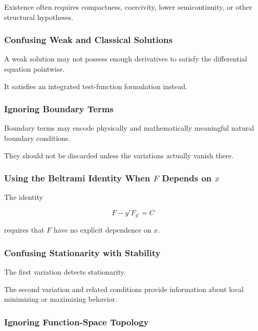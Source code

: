 Existence often requires compactness, coercivity, lower semicontinuity,
or other structural hypotheses.

\subsubsection{Confusing Weak and Classical Solutions}

A weak solution may not possess enough derivatives to satisfy the
differential equation pointwise.

It satisfies an integrated test-function formulation instead.

\subsubsection{Ignoring Boundary Terms}

Boundary terms may encode physically and mathematically meaningful
natural boundary conditions.

They should not be discarded unless the variations actually vanish there.

\subsubsection{Using the Beltrami Identity When \(F\) Depends on \(x\)}

The identity

\[
F-y'F_{y'}=C
\]

requires that \(F\) have no explicit dependence on \(x\).

\subsubsection{Confusing Stationarity with Stability}

The first variation detects stationarity.

The second variation and related conditions provide information about
local minimizing or maximizing behavior.

\subsubsection{Ignoring Function-Space Topology}

